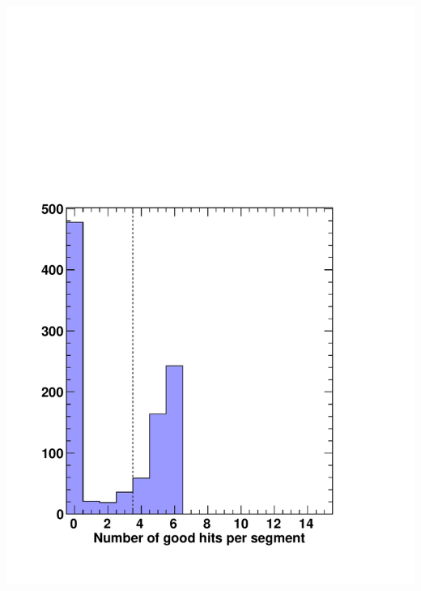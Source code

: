 \documentclass[compress]{beamer}
\begin{document}
\begin{frame}
\begin{columns}
\includegraphics[width=\linewidth]{REAL_hits_on_segments.pdf}


\end{columns}
\end{frame}
\end{document}
